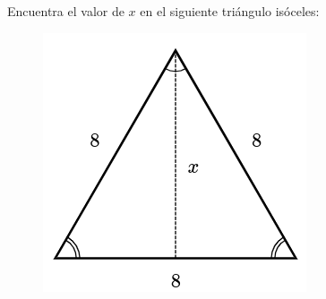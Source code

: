 Encuentra el valor de $x$ en el siguiente triángulo isóceles:

\begin{figure}[H]
    \centering
    \includegraphics[width=0.2\linewidth]{../images/pitagoras12.png}
    \caption{}
    \label{fig:pitagoras12}
\end{figure}

